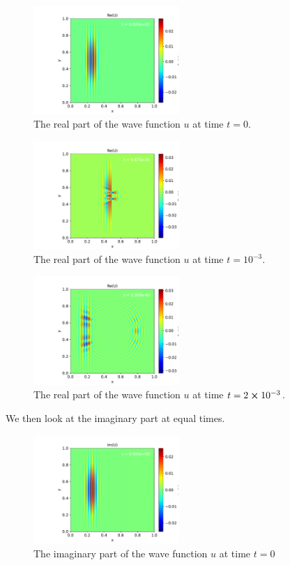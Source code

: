 \documentclass[english,notitlepage,reprint,nofootinbib]{revtex4-2}  %
\begin{document}
	\begin{figure}[H]
		\centering
		\includegraphics[width=0.49\textwidth]{figures/problem8_U_Re_0.000.pdf}
		\caption{The real part of the wave function $u$ at time $t = 0$.}
		\label{fig:prob8_Re0}
	\end{figure}

	\begin{figure}[h!]
		\centering
		\includegraphics[width=0.49\textwidth]{figures/problem8_U_Re_0.001.pdf}
		\caption{The real part of the wave function $u$ at time $t = 10^{-3}$.}
		\label{fig:prob8_Re1}
	\end{figure}

	\begin{figure}[h!]
		\centering
		\includegraphics[width=0.49\textwidth]{figures/problem8_U_Re_0.002.pdf}
		\caption{The real part of the wave function $u$ at time $t = 2\cross10^{-3}$.}
		\label{fig:prob8_Re2}
	\end{figure}
	We then look at the imaginary part at equal times.
	\begin{figure}[h!]
		\centering
		\includegraphics[width=0.49\textwidth]{figures/problem8_U_Im_0.000.pdf}
		\caption{The imaginary part of the wave function $u$ at time $t = 0$}
		\label{fig:prob8_Im0}
	\end{figure}
	
\end{document}
